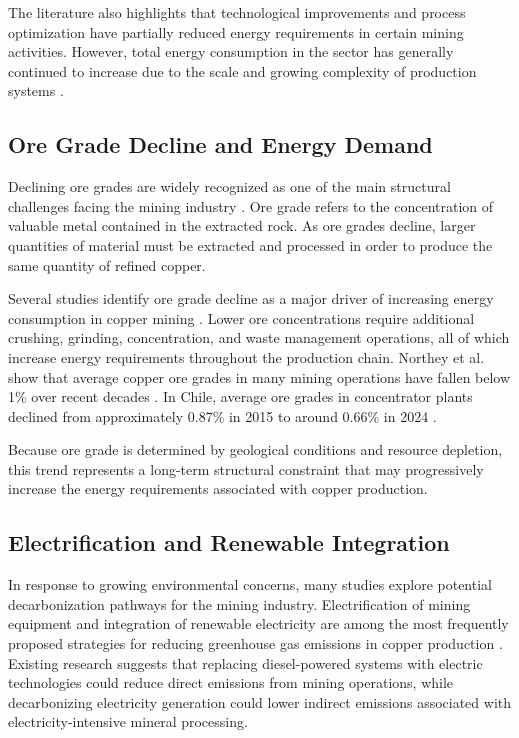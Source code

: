 The literature also highlights that technological improvements and process optimization have partially reduced energy requirements in certain mining activities. However, total energy consumption in the sector has generally continued to increase due to the scale and growing complexity of production systems \cite{Calvo2016}.


\subsection{Ore Grade Decline and Energy Demand}

Declining ore grades are widely recognized as one of the main structural challenges facing the mining industry \cite{Calvo2016,Northey2014}. Ore grade refers to the concentration of valuable metal contained in the extracted rock. As ore grades decline, larger quantities of material must be extracted and processed in order to produce the same quantity of refined copper.

Several studies identify ore grade decline as a major driver of increasing energy consumption in copper mining \cite{Calvo2016}. Lower ore concentrations require additional crushing, grinding, concentration, and waste management operations, all of which increase energy requirements throughout the production chain. Northey et al. show that average copper ore grades in many mining operations have fallen below 1\% over recent decades \cite{Northey2014}. In Chile, average ore grades in concentrator plants declined from approximately 0.87\% in 2015 to around 0.66\% in 2024 \cite{Cochilco2024}.

Because ore grade is determined by geological conditions and resource depletion, this trend represents a long-term structural constraint that may progressively increase the energy requirements associated with copper production.


\subsection{Electrification and Renewable Integration}
\label{sec:elec & renew}
In response to growing environmental concerns, many studies explore potential decarbonization pathways for the mining industry. Electrification of mining equipment and integration of renewable electricity are among the most frequently proposed strategies for reducing greenhouse gas emissions in copper production \cite{Memary2022}. Existing research suggests that replacing diesel-powered systems with electric technologies could reduce direct emissions from mining operations, while decarbonizing electricity generation could lower indirect emissions associated with electricity-intensive mineral processing.

